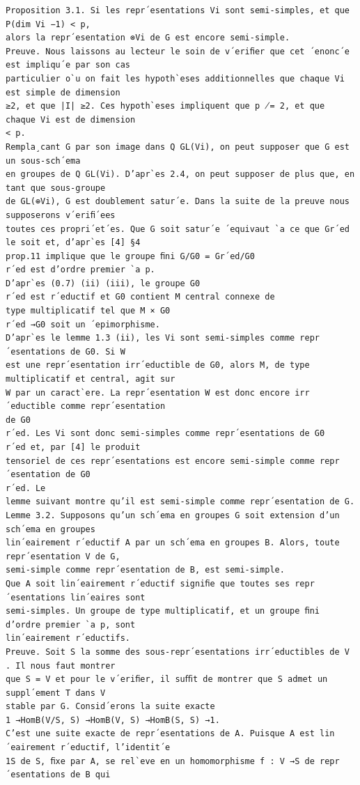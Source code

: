 \documentclass[10pt]{article}
\begin{document}
\begin{verbatim}
Proposition 3.1. Si les repr´esentations Vi sont semi-simples, et que P(dim Vi −1) < p,
alors la repr´esentation ⊗Vi de G est encore semi-simple.
Preuve. Nous laissons au lecteur le soin de v´eriﬁer que cet ´enonc´e est impliqu´e par son cas
particulier o`u on fait les hypoth`eses additionnelles que chaque Vi est simple de dimension
≥2, et que |I| ≥2. Ces hypoth`eses impliquent que p ̸= 2, et que chaque Vi est de dimension
< p.
Rempla¸cant G par son image dans Q GL(Vi), on peut supposer que G est un sous-sch´ema
en groupes de Q GL(Vi). D’apr`es 2.4, on peut supposer de plus que, en tant que sous-groupe
de GL(⊕Vi), G est doublement satur´e. Dans la suite de la preuve nous supposerons v´eriﬁ´ees
toutes ces propri´et´es. Que G soit satur´e ´equivaut `a ce que Gr´ed le soit et, d’apr`es [4] §4
prop.11 implique que le groupe ﬁni G/G0 = Gr´ed/G0
r´ed est d’ordre premier `a p.
D’apr`es (0.7) (ii) (iii), le groupe G0
r´ed est r´eductif et G0 contient M central connexe de
type multiplicatif tel que M × G0
r´ed →G0 soit un ´epimorphisme.
D’apr`es le lemme 1.3 (ii), les Vi sont semi-simples comme repr´esentations de G0. Si W
est une repr´esentation irr´eductible de G0, alors M, de type multiplicatif et central, agit sur
W par un caract`ere. La repr´esentation W est donc encore irr´eductible comme repr´esentation
de G0
r´ed. Les Vi sont donc semi-simples comme repr´esentations de G0
r´ed et, par [4] le produit
tensoriel de ces repr´esentations est encore semi-simple comme repr´esentation de G0
r´ed. Le
lemme suivant montre qu’il est semi-simple comme repr´esentation de G.
Lemme 3.2. Supposons qu’un sch´ema en groupes G soit extension d’un sch´ema en groupes
lin´eairement r´eductif A par un sch´ema en groupes B. Alors, toute repr´esentation V de G,
semi-simple comme repr´esentation de B, est semi-simple.
Que A soit lin´eairement r´eductif signiﬁe que toutes ses repr´esentations lin´eaires sont
semi-simples. Un groupe de type multiplicatif, et un groupe ﬁni d’ordre premier `a p, sont
lin´eairement r´eductifs.
Preuve. Soit S la somme des sous-repr´esentations irr´eductibles de V . Il nous faut montrer
que S = V et pour le v´eriﬁer, il suﬃt de montrer que S admet un suppl´ement T dans V
stable par G. Consid´erons la suite exacte
1 →HomB(V/S, S) →HomB(V, S) →HomB(S, S) →1.
C’est une suite exacte de repr´esentations de A. Puisque A est lin´eairement r´eductif, l’identit´e
1S de S, ﬁxe par A, se rel`eve en un homomorphisme f : V →S de repr´esentations de B qui


\end{verbatim}
\end{document}
